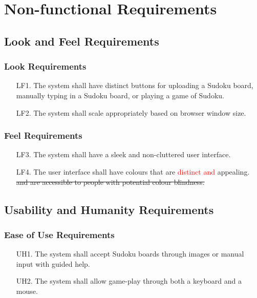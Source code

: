 \documentclass[11pt]{article}
\begin{document}
\section{Non-functional Requirements}

\subsection{Look and Feel Requirements}

\subsubsection{Look Requirements}

\begin{enumerate} %
    \item [LF1.] The system shall have distinct buttons for uploading a Sudoku board, manually typing in a Sudoku board, or playing a game of Sudoku.
    \item [LF2.] The system shall scale appropriately based on browser window size.
\end{enumerate}

\subsubsection{Feel Requirements}

\begin{enumerate} %
    \item [LF3.] The system shall have a sleek and non-cluttered user interface.
    \item [LF4.] The user interface shall have colours that are \textcolor{red}{distinct and} appealing. \sout{and are accessible to people with potential colour blindness.}
\end{enumerate}

\subsection{Usability and Humanity Requirements}

\subsubsection{Ease of Use Requirements}

\begin{enumerate}
    \item [UH1.] The system shall accept Sudoku boards through images or manual input with guided help.
    
    \item [UH2.] The system shall allow game-play through both a keyboard and a mouse.
\end{enumerate}
\end{document}

